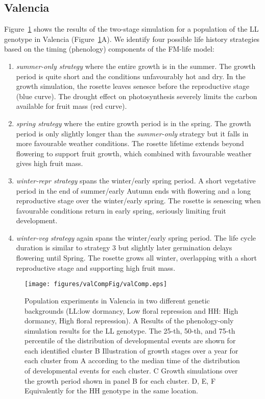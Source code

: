 \subsection{Valencia}
\label{valencia}
Figure~\ref{fig:valComp} shows the results of the two-stage simulation for a population
of the LL genotype in Valencia (Figure~\ref{fig:valComp}A). We identify four possible
life history strategies based on the timing (phenology) components of
the FM-life model:
\begin{enumerate}
\def\labelenumi{\arabic{enumi}.}
\item
  \emph{summer-only strategy} where the entire growth is in the summer.
  The growth period is quite short and the conditions unfavourably hot
  and dry. In the growth simulation, the rosette leaves senesce before
  the reproductive stage (blue curve). The drought effect on
  photosynthesis severely limits the carbon available for fruit mass
  (red curve).
\item
  \emph{spring strategy} where the entire growth period is in the
  spring. The growth period is only slightly longer than the
  \emph{summer-only} strategy but it falls in more favourable weather
  conditions. The rosette lifetime extends beyond flowering to support
  fruit growth, which combined with favourable weather gives high fruit
  mass.
\item
  \emph{winter-repr strategy} spans the winter/early spring period. A
  short vegetative period in the end of summer/early Autumn ends with
  flowering and a long reproductive stage over the winter/early spring.
  The rosette is senescing when favourable conditions return in early
  spring, seriously limiting fruit development.
\item
  \emph{winter-veg strategy} again spans the winter/early spring period.
  The life cycle duration is similar to strategy 3 but slightly later
  germination delays flowering until Spring. The rosette grows all
  winter, overlapping with a short reproductive stage and supporting
  high fruit mass.
\end{enumerate}

\begin{figure}[p]
\texttt{[image: figures/valCompFig/valComp.eps]}
\caption{Population experiments in Valencia in two different genetic backgrounds
  (LL:low dormancy, Low floral repression and HH: High dormancy, High floral
  repression). A Results of the phenology-only simulation results for the LL
  genotype. The 25-th, 50-th, and 75-th percentile of the distribution of
  developmental events are shown for each identified cluster B Illustration of
  growth stages over a year for each cluster from A according to the median time
  of the distribution of developmental events for each cluster. C Growth
  simulations over the growth period shown in panel B for each cluster.  D, E, F
  Equivalently for the HH genotype in the same location.}
\label{fig:valComp}
\end{figure}


